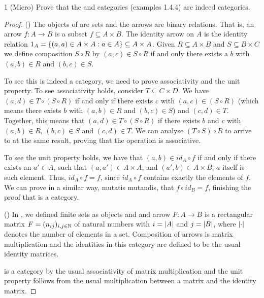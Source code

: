 \begin{exercise}{1 (Micro)}
Prove that the \Rel and \Matrix categories (examples 1.4.4) are indeed categories.
\end{exercise}
\begin{proof}
(\Rel)
The objects of \Rel are sets and the arrows are binary relations.
That is, an arrow $f: A \to B$ is a subset $f \subseteq A \times B$.
The identity arrow on $A$ is the identity relation $1_A = \{(a, a) \in A \times A: a \in A\} \subseteq A \times A$.
Given $R \subseteq A \times B$ and $S \subseteq B \times C$ we define composition $S \circ R$ by $(a, c) \in S \circ R$ if and only there exists a $b$ with $(a, b) \in R$ and $(b, c) \in S$.

To see this is indeed a category, we need to prove associativity and the unit property.
To see associativity holds, consider $T \subseteq C \times D$.
We have $(a, d) \in T \circ (S \circ R)$ if and only if there exists $c$ with $(a, c) \in (S \circ R)$ (which means there exists $b$ with $(a,b) \in R$ and $(b, c) \in S$) and $(c, d) \in T$.
Together, this means that $(a, d) \in T \circ (S \circ R)$ if there exists $b$ and $c$ with $(a, b) \in R$, $(b, c) \in S$ and $(c, d) \in T$.
We can analyse $(T \circ S) \circ R$ to arrive to at the same result, proving that the operation is associative.

To see the unit property holds, we have that $(a, b) \in id_A \circ f$ if and only if there exists an $a' \in A$, such that $(a, a') \in A \times A$, and $(a', b) \in A \times B$, $a$ itself is such element.
Thus, $id_A \circ f = f$, since $id_A \circ f$ contains exactly the elements of $f$.
We can prove in a similar way, mutatis mutandis, that $f \circ id_B = f$, finishing the proof that \Rel is a category.

(\Matrix)
In \Matrix, we defined finite sets as objects and and arrow $F: A \to B$ is a rectangular matrix $F = (n_{ij})_{i, j \in \mathbb{N}}$ of natural numbers with $i = \left\lvert A\right\rvert$ and $j = \left\lvert B\right\rvert$, where $\left\lvert \cdot\right\rvert$ denotes the number of elements in a set.
Composition of arrows is matrix multiplication and the identities in this category are defined to be the usual identity matrices.

\Matrix is a category by the usual associativity of matrix multiplication and the unit property follows from the usual multiplication between a matrix and the identity matrix.
\end{proof} 

